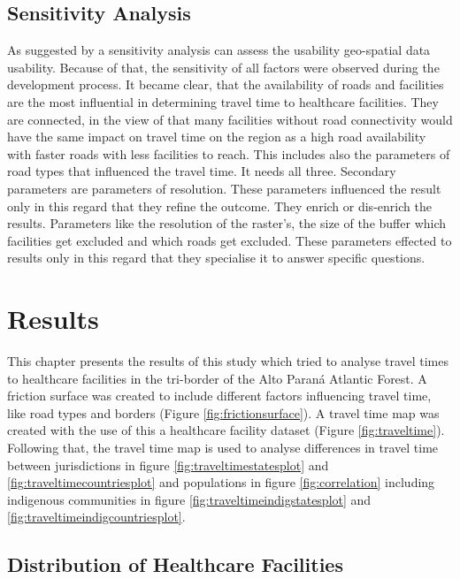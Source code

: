 \documentclass[11pt, a4paper]{report}
\begin{document}
\section{Sensitivity Analysis}
As suggested by \cite{frew_investigating_2017} a sensitivity analysis can assess the usability geo-spatial data usability. Because of that, the sensitivity of all factors were observed during the development process. It became clear, that the availability of roads and facilities are the most influential in determining travel time to healthcare facilities. They are connected, in the view of that many facilities without road connectivity would have the same impact on travel time on the region as a high road availability with faster roads with less facilities to reach. This includes also the parameters of road types that influenced the travel time. It needs all three. Secondary parameters are parameters of resolution. These parameters influenced the result only in this regard that they refine the outcome. They enrich or dis-enrich the results. Parameters like the resolution of the raster's, the size of the buffer which facilities get excluded and which roads get excluded. These parameters effected to results only in this regard that they specialise it to answer specific questions.

\chapter{Results}

This chapter presents the results of this study which tried to analyse travel times to healthcare facilities in the tri-border of the Alto Paraná Atlantic Forest. A friction surface was created to include different factors influencing travel time, like road types and borders (Figure \ref{fig:frictionsurface}). A travel time map was created with the use of this a healthcare facility dataset (Figure \ref{fig:traveltime}). Following that, the travel time map is used to analyse differences in travel time between jurisdictions in figure \ref{fig:traveltimestatesplot} and \ref{fig:traveltimecountriesplot} and populations in figure \ref{fig:correlation} including indigenous communities in figure \ref{fig:traveltimeindigstatesplot} and \ref{fig:traveltimeindigcountriesplot}. 

\section{Distribution of Healthcare Facilities}
\end{document}
